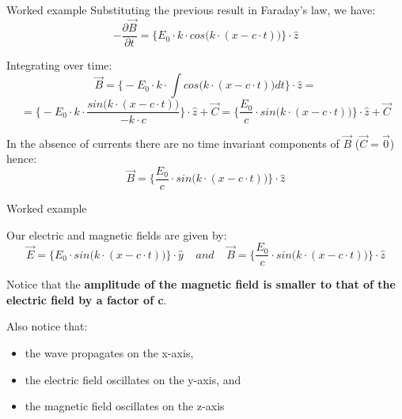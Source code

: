 {\begin{frame}{Worked example}
Substituting the previous result in Faraday's law, we have:
\begin{equation*}
  - \frac{\partial \vec{B}}{\partial t} = \bigg\{  E_{0} \cdot k \cdot cos\Big(k \cdot (x-c \cdot t)\Big) \bigg\} \cdot \hat{z}
\end{equation*}

Integrating over time:
\begin{equation*}
  \vec{B} = \bigg\{ - E_{0} \cdot k \cdot \int cos\Big(k \cdot (x-c \cdot t)\Big) dt \bigg\} \cdot \hat{z} =
\end{equation*}
\begin{equation*}
   = \bigg\{ - E_{0} \cdot k \cdot \frac{sin\Big(k \cdot (x-c \cdot t)\Big)}{-k \cdot c} \bigg\} \cdot \hat{z} + \vec{C} =
       \bigg\{ \frac{E_{0}}{c} \cdot sin\Big(k \cdot (x-c \cdot t)\Big) \bigg\} \cdot \hat{z} + \vec{C}
\end{equation*}

In the absence of currents there are no time invariant components of $\vec{B}$ ($\vec{C} = \vec{0}$) hence:
\begin{equation*}
  \vec{B} = \bigg\{ \frac{E_{0}}{c} \cdot sin\Big(k \cdot (x-c \cdot t)\Big) \bigg\} \cdot \hat{z}
\end{equation*}


\end{frame}

%
%
%
%

\begin{frame}{Worked example}

Our electric and magnetic fields are given by:
\begin{equation*}
   \vec{E} = \bigg\{ E_{0} \cdot sin\Big(k \cdot (x-c \cdot t)\Big) \bigg\} \cdot \hat{y}
    \;\;\;\; and \;\;\;\;
   \vec{B} = \bigg\{ \frac{E_{0}}{c} \cdot sin\Big(k \cdot (x-c \cdot t)\Big) \bigg\} \cdot \hat{z}
\end{equation*}

Notice that the {\bf amplitude of the magnetic field is smaller to that of the electric field
by a factor of c}.\\

\vspace{0.2cm}

Also notice that:
\begin{itemize}
   \item the wave propagates on the x-axis,
   \item the electric field oscillates on the y-axis, and
   \item the magnetic field oscillates on the z-axis
\end{itemize}


\end{frame}}
